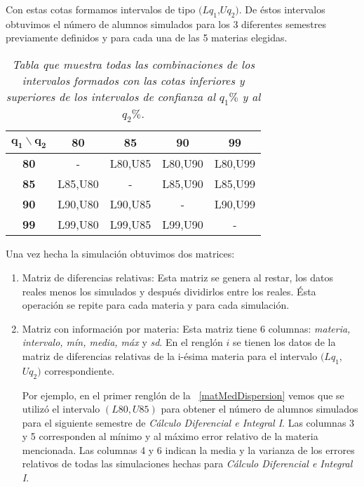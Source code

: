 Con estas cotas formamos intervalos de tipo $(Lq_{1}$,$Uq_{2})$. De éstos intervalos obtuvimos el número de alumnos simulados para los 3 diferentes semestres previamente definidos y para cada una de las 5 materias elegidas.

\begin{table}[H]
\centering
\begin{tabular}{|c|c|c|c|c|}
\hline 
$\textbf{q}_{\textbf{1}} \backslash \textbf{q}_{\textbf{2}}$ & \textbf{80} & \textbf{85} & \textbf{90} & \textbf{99} \\ 
\hline 
\textbf{80} & - & L80,U85 & L80,U90 & L80,U99 \\ 
\hline 
\textbf{85} & L85,U80 & - & L85,U90 & L85,U99 \\ 
\hline 
\textbf{90} & L90,U80 & L90,U85 & - & L90,U99 \\ 
\hline 
\textbf{99} & L99,U80 & L99,U85 & L99,U90 & - \\ 
\hline 
\end{tabular} 
\caption[\textit{Posibles valores para $q_{1}$ y $q_{2}$}]{\textit{Tabla que muestra todas las combinaciones de los intervalos formados con las cotas inferiores y superiores de los intervalos de confianza al $q_{1}\%$ y al $q_{2}\%$.}}\label{valoresQ1Q2}
\end{table}


Una vez hecha la simulación obtuvimos dos matrices:

\begin{enumerate}
\item Matriz de diferencias relativas: Esta matriz se genera al restar, los datos reales menos los simulados y después dividirlos entre los reales. Ésta operación se repite para cada materia y para cada simulación.

\item Matriz con información por materia: Esta matriz tiene 6 columnas: \textit{materia, intervalo, mín, media, máx} y \textit{sd}. En el renglón $i$ se tienen los datos de la matriz de diferencias relativas de la i-ésima materia para el intervalo $(Lq_{1}$,$Uq_{2})$ correspondiente.

Por ejemplo, en el primer renglón de la \figurename{~\ref{matMedDispersion}} vemos que se utilizó el intervalo $(L80,U85)$ para obtener el número de alumnos simulados para el siguiente semestre de \textit{Cálculo Diferencial e Integral I}. Las columnas 3 y 5 corresponden al mínimo y al máximo error relativo de la materia mencionada. Las columnas 4 y 6 indican la media y la varianza de los errores relativos de todas las simulaciones hechas para \textit{Cálculo Diferencial e Integral I}.
\end{enumerate}

